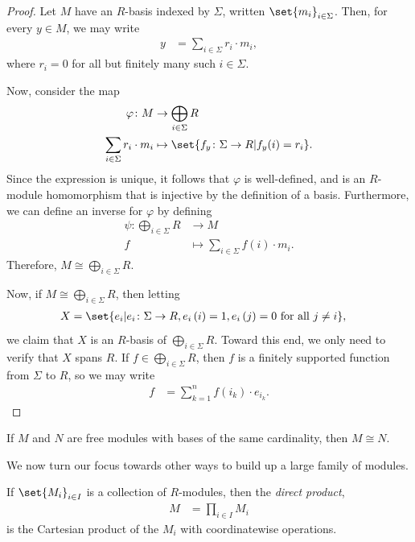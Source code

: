 \documentclass[10pt]{mypackage}
\begin{document}
\begin{proof}
  Let $M$ have an $R$-basis indexed by $\Sigma$, written $\set{m_i}_{i\in \Sigma}$. Then, for every $y\in M$, we may write
  \begin{align*}
    y &= \sum_{i\in \Sigma} r_i\cdot m_i,
  \end{align*}
  where $r_i = 0$ for all but finitely many such $i\in \Sigma$.%

  Now, consider the map
  \begin{align*}
    \varphi\colon M&\rightarrow \bigoplus_{i\in \Sigma}R\\
    \sum_{i\in\Sigma}r_i\cdot m_i &\mapsto \set{f_y\colon \Sigma\rightarrow R | f_y(i) = r_i}.
  \end{align*}
  Since the expression is unique, it follows that $\varphi$ is well-defined, and is an $R$-module homomorphism that is injective by the definition of a basis. Furthermore, we can define an inverse for $\varphi$ by defining
  \begin{align*}
    \psi\colon \bigoplus_{i\in\Sigma}R &\rightarrow M\\
    f &\mapsto \sum_{i\in\Sigma}f(i)\cdot m_i.
  \end{align*}
  Therefore, $M\cong \bigoplus_{i\in \Sigma}R$.%

  Now, if $M\cong \bigoplus_{i\in \Sigma}R$, then letting
  \begin{align*}
    X &= \set{e_i | e_i\colon \Sigma\rightarrow R, e_i\left( i \right) = 1, e_i\left( j \right) = 0\text{ for all }j\neq i},
  \end{align*}
  we claim that $X$ is an $R$-basis of $\bigoplus_{i\in \Sigma} R$. Toward this end, we only need to verify that $X$ spans $R$. If $f\in \bigoplus_{i\in \Sigma}R$, then $f$ is a finitely supported function from $\Sigma$ to $R$, so we may write
  \begin{align*}
    f &= \sum_{k=1}^{n} f\left( i_k \right)\cdot e_{i_k}.
  \end{align*}
\end{proof}
\begin{corollary}
  If $M$ and $N$ are free modules with bases of the same cardinality, then $M\cong N$.
\end{corollary}
We now turn our focus towards other ways to build up a large family of modules.
\begin{definition}
  If $\set{M_i}_{i\in I}$ is a collection of $R$-modules, then the \textit{direct product}, 
  \begin{align*}
    M &= \prod_{i\in I}M_i
  \end{align*}
  is the Cartesian product of the $M_i$ with coordinatewise operations.
\end{definition}
\end{document}
